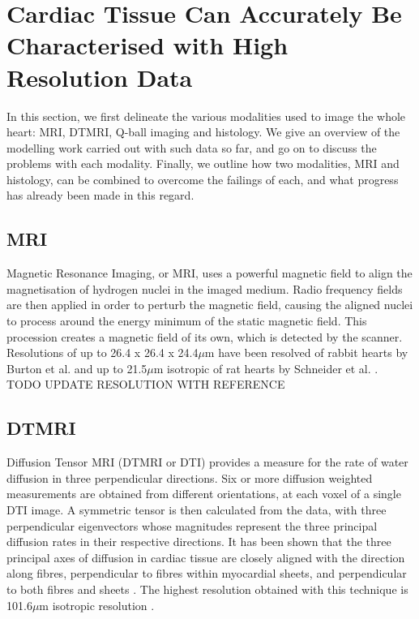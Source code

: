 \section{Cardiac Tissue Can Accurately Be Characterised with High Resolution Data} %
\label{sec:cardiac_tissue_can_be_accurately_characterised_with_high_resolution_data}
  In this section, we first delineate the various modalities used to image the whole heart: MRI, DTMRI, Q-ball imaging and histology. We give an overview of the modelling work carried out with such data so far, and go on to discuss the problems with each modality. Finally, we outline how two modalities, MRI and histology, can be combined to overcome the failings of each, and what progress has already been made in this regard.
  
  \subsection{MRI} %
  \label{sub:mri}
    Magnetic Resonance Imaging, or MRI, uses a powerful magnetic field to align the magnetisation of hydrogen nuclei in the imaged medium. Radio frequency fields are then applied in order to perturb the magnetic field, causing the aligned nuclei to process around the energy minimum of the static magnetic field. This procession creates a magnetic field of its own, which is detected by the scanner. Resolutions of up to 26.4 x 26.4 x 24.4$\mu$m have been resolved of rabbit hearts by Burton et al. \cite{Burton2006} and up to 21.5$\mu$m isotropic of rat hearts by Schneider et al. \cite{Schneider2004}. TODO UPDATE RESOLUTION WITH REFERENCE
    
  \subsection{DTMRI} %
  \label{sub:dtmri}
    Diffusion Tensor MRI (DTMRI or DTI) provides a measure for the rate of water diffusion in three perpendicular directions. Six or more diffusion weighted measurements are obtained from different orientations, at each voxel of a single DTI image. A symmetric tensor is then calculated from the data, with three perpendicular eigenvectors whose magnitudes represent the three principal diffusion rates in their respective directions. It has been shown that the three principal axes of diffusion in cardiac tissue are closely aligned with the direction along fibres, perpendicular to fibres within myocardial sheets, and perpendicular to both fibres and sheets \cite{Scollan1998}. The highest resolution obtained with this technique is 101.6$\mu$m isotropic resolution \cite{Bishop2009}.
  
